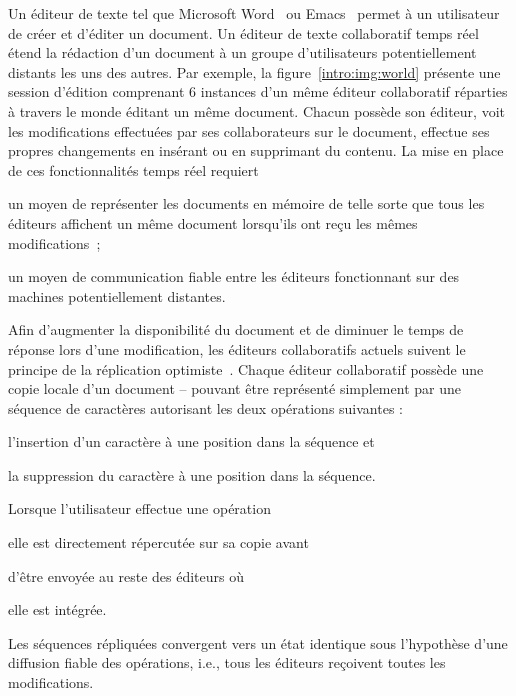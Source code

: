 Un éditeur de texte tel que Microsoft Word~\cite{word} ou Emacs~\cite{emacs}
permet à un utilisateur de créer et d'éditer un document. Un éditeur de texte
collaboratif temps réel~\cite{ellis1991groupware} étend la rédaction d'un
document à un groupe d'utilisateurs potentiellement distants les uns des autres.
Par exemple, la figure~\ref{intro:img:world} présente une session d'édition
comprenant 6 instances d'un même éditeur collaboratif réparties à travers le
monde éditant un même document. Chacun possède son éditeur, voit les
modifications effectuées par ses collaborateurs sur le document, effectue ses
propres changements en insérant ou en supprimant du contenu.  La mise en place
de ces fonctionnalités temps réel requiert
\begin{inparaenum}[(i)]
\item un moyen de représenter les documents en mémoire de telle sorte que tous
  les éditeurs affichent un même document lorsqu'ils ont reçu les mêmes
  modifications~\cite{burckhardt2014replicated, shapiro2011conflict};
\item un moyen de communication fiable entre les éditeurs fonctionnant sur des
  machines potentiellement distantes.
\end{inparaenum}

Afin d'augmenter la disponibilité du document et de diminuer le temps de réponse
lors d'une modification, les éditeurs collaboratifs actuels suivent le principe
de la réplication optimiste~\cite{saito2005optimistic}. Chaque éditeur
collaboratif possède une copie locale d'un document -- pouvant être représenté
simplement par une séquence
de caractères autorisant les deux opérations suivantes :
\begin{inparaenum}[(a)]
\item l'insertion d'un caractère à une position dans la séquence et
\item la suppression du caractère à une position dans la séquence.
\end{inparaenum}
Lorsque l'utilisateur effectue une opération
\begin{inparaenum}[(i)]
\item elle est directement répercutée sur sa copie avant
\item d'être envoyée au reste des éditeurs où
\item elle est intégrée.
\end{inparaenum}
Les séquences répliquées convergent vers un état identique sous l'hypothèse
d'une diffusion fiable des opérations, i.e., tous les éditeurs reçoivent toutes
les modifications.

